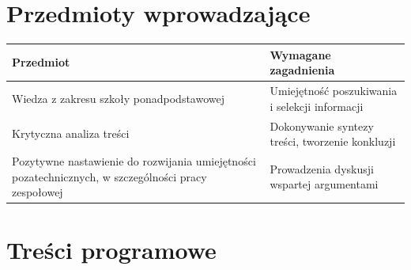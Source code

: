 \documentclass[12pt, a4paper]{article}
\begin{document}
\section{Przedmioty wprowadzające}

\begin{tabularx}{\textwidth}{lX}
  \hline
  \textbf{Przedmiot} & \textbf{Wymagane zagadnienia} \\
  \hline
  Wiedza z zakresu szkoły ponadpodstawowej & Umiejętność poszukiwania i selekcji informacji \\
  Krytyczna analiza treści & Dokonywanie syntezy treści, tworzenie konkluzji \\
  Pozytywne nastawienie do rozwijania umiejętności pozatechnicznych, w szczególności pracy zespołowej & Prowadzenia dyskusji wspartej argumentami \\
  \hline
\end{tabularx}

\section{Treści programowe}
\end{document}
